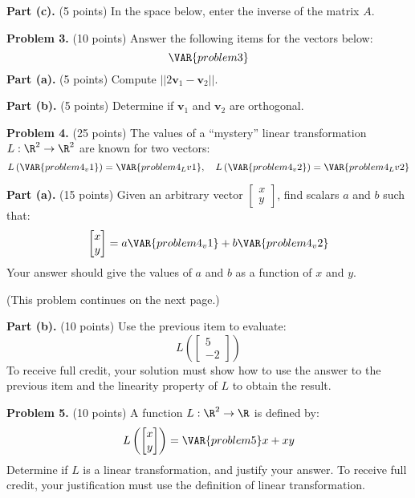 \documentclass[12pt]{article}
\begin{document}
\vskip3.5in

\textbf{Part (c).} (5 points) In the space below, enter the inverse of the matrix $A$.

\clearpage

\textbf{Problem 3.} (10 points) Answer the following items for the vectors below:
\[
\VAR{problem3}
\]
\textbf{Part (a).} (5 points) Compute $||2\textbf{v}_1-\textbf{v}_2||$.

\vskip3.5in

\textbf{Part (b).} (5 points) Determine if $\textbf{v}_1$ and $\textbf{v}_2$ are orthogonal.

\clearpage

\textbf{Problem 4.} (25 points) The values of a ``mystery'' linear transformation $L:\R^2\to\R^2$ are known for two vectors:
\[
L\left(\VAR{problem4_v1}\right)=\VAR{problem4_Lv1},\quad L\left(\VAR{problem4_v2}\right)=\VAR{problem4_Lv2}
\]

\textbf{Part (a).} (15 points) Given an arbitrary vector $\begin{bmatrix}x\\y\end{bmatrix}$, find scalars $a$ and $b$ such that:
\[
\begin{bmatrix}x\\y\end{bmatrix}=a\VAR{problem4_v1}+b\VAR{problem4_v2}
\]
Your answer should give the values of $a$ and $b$ as a function of $x$ and $y$.

\vfill
(This problem continues on the next page.)

\clearpage

\textbf{Part (b).} (10 points) Use the previous item to evaluate:
\[
L\left(\begin{bmatrix}5\\-2\end{bmatrix}\right)
\]
To receive full credit, your solution must show how to use the answer to the previous item and the linearity property of $L$ to obtain the result. 

\clearpage

\textbf{Problem 5.} (10 points) A function $L:\R^2\to\R$ is defined by:
\[
L\left(\begin{bmatrix}x\\y\end{bmatrix}\right)=\VAR{problem5}x+xy
\]
Determine if $L$ is a linear transformation, and justify your answer. To receive full credit, your justification must use the definition of linear transformation.
\end{document}
